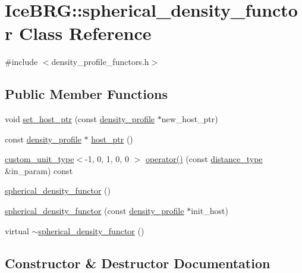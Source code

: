 \hypertarget{classIceBRG_1_1spherical__density__functor}{}\section{Ice\+B\+R\+G\+:\+:spherical\+\_\+density\+\_\+functor Class Reference}
\label{classIceBRG_1_1spherical__density__functor}


{\ttfamily \#include $<$density\+\_\+profile\+\_\+functors.\+h$>$}

\subsection*{Public Member Functions}
\begin{DoxyCompactItemize}
\item 
void \hyperlink{classIceBRG_1_1spherical__density__functor_a60817cf2b168a9d5f1d31b98880a6fbe}{set\+\_\+host\+\_\+ptr} (const \hyperlink{classIceBRG_1_1density__profile}{density\+\_\+profile} $\ast$new\+\_\+host\+\_\+ptr)
\item 
const \hyperlink{classIceBRG_1_1density__profile}{density\+\_\+profile} $\ast$ \hyperlink{classIceBRG_1_1spherical__density__functor_afe7b0c3875cb3491240f1ef685d99a35}{host\+\_\+ptr} ()
\item 
\hyperlink{namespaceIceBRG_a896bc1bf7e8db5ca045b9cf35912ca5e}{custom\+\_\+unit\+\_\+type}$<$-\/1, 0, 1, 0, 0 $>$ \hyperlink{classIceBRG_1_1spherical__density__functor_a8974c9295a78c182ec4ff230d836439c}{operator()} (const \hyperlink{namespaceIceBRG_a45499647eb87e24c10ab32c628711cec}{distance\+\_\+type} \&in\+\_\+param) const 
\item 
\hyperlink{classIceBRG_1_1spherical__density__functor_ae18cd7fcc5679e8e4dfac04920ee12fc}{spherical\+\_\+density\+\_\+functor} ()
\item 
\hyperlink{classIceBRG_1_1spherical__density__functor_a2a902000b1b69bf16e63855fe18183db}{spherical\+\_\+density\+\_\+functor} (const \hyperlink{classIceBRG_1_1density__profile}{density\+\_\+profile} $\ast$init\+\_\+host)
\item 
virtual \hyperlink{classIceBRG_1_1spherical__density__functor_ac4361b6d9f844ec5ad54f766c99c16c7}{$\sim$spherical\+\_\+density\+\_\+functor} ()
\end{DoxyCompactItemize}


\subsection{Constructor \& Destructor Documentation}
\hypertarget{classIceBRG_1_1spherical__density__functor_ae18cd7fcc5679e8e4dfac04920ee12fc}{}
